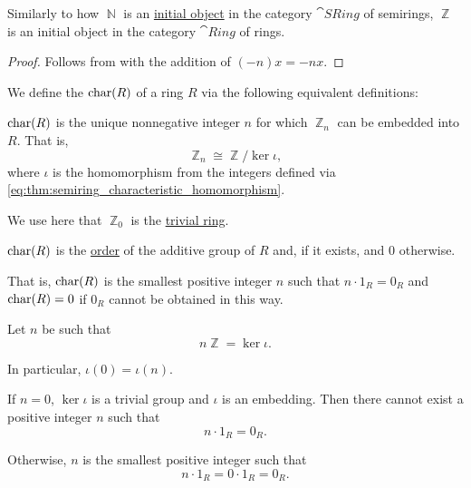 \begin{proposition}\label{thm:ring_characteristic_homomorphism}
  Similarly to how \( \BbbN \) is an \hyperref[def:universal_objects/initial]{initial object} in the category \hyperref[def:semiring/category]{\( \cat{SRing} \)} of semirings, \( \BbbZ \) is an initial object in the category \hyperref[def:ring/category]{\( \cat{Ring} \)} of rings.
\end{proposition}
\begin{proof}
  Follows from  with the addition of \( (-n)x = -nx \).
\end{proof}

\begin{definition}\label{def:ring_characteristic}\mimprovised
  We define the  \( \operatorname{char}(R) \) of a ring \( R \) via the following equivalent definitions:
  \begin{thmenum}
     \( \operatorname{char}(R) \) is the unique nonnegative integer \( n \) for which \( \BbbZ_n \) can be embedded into \( R \). That is,
    \begin{equation*}
      \BbbZ_n \cong \BbbZ / \ker \iota,
    \end{equation*}
    where \( \iota \) is the homomorphism from the integers defined via \eqref{eq:thm:semiring_characteristic_homomorphism}.

    We use here that \( \BbbZ_0 \) is the \hyperref[def:ring/trivial]{trivial ring}.

     \( \operatorname{char}(R) \) is the \hyperref[def:group_order]{order} of the additive group of \( R \) and, if it exists, and \( 0 \) otherwise.

    That is, \( \operatorname{char}(R) \) is the smallest positive integer \( n \) such that \( n \cdot 1_R = 0_R \) and \( \operatorname{char}(R) = 0 \) if \( 0_R \) cannot be obtained in this way.
  \end{thmenum}
\end{definition}
\begin{defproof}
   Let \( n \) be such that
  \begin{equation*}
    n \BbbZ = \ker\iota.
  \end{equation*}

  In particular, \( \iota(0) = \iota(n) \).

  If \( n = 0 \), \( \ker\iota \) is a trivial group and \( \iota \) is an embedding. Then there cannot exist a positive integer \( n \) such that
  \begin{equation*}
    n \cdot 1_R = 0_R.
  \end{equation*}

  Otherwise, \( n \) is the smallest positive integer such that
  \begin{equation*}
    n \cdot 1_R = 0 \cdot 1_R = 0_R.
  \end{equation*}
\end{defproof}

